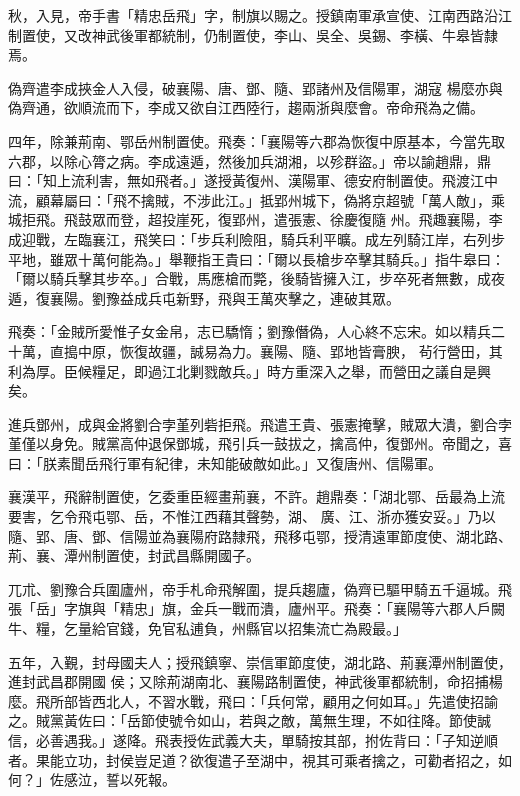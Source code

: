 \begin{pinyinscope}
 秋，入見，帝手書「精忠岳飛」字，制旗以賜之。授鎮南軍承宣使、江南西路沿江制置使，又改神武後軍都統制，仍制置使，李山、吳全、吳錫、李橫、牛皋皆隸焉。



 偽齊遣李成挾金人入侵，破襄陽、唐、鄧、隨、郢諸州及信陽軍，湖寇
 楊麼亦與偽齊通，欲順流而下，李成又欲自江西陸行，趨兩浙與麼會。帝命飛為之備。



 四年，除兼荊南、鄂岳州制置使。飛奏：「襄陽等六郡為恢復中原基本，今當先取六郡，以除心膂之病。李成遠遁，然後加兵湖湘，以殄群盜。」帝以諭趙鼎，鼎曰：「知上流利害，無如飛者。」遂授黃復州、漢陽軍、德安府制置使。飛渡江中流，顧幕屬曰：「飛不擒賊，不涉此江。」抵郢州城下，偽將京超號「萬人敵」，乘城拒飛。飛鼓眾而登，超投崖死，復郢州，遣張憲、徐慶復隨
 州。飛趣襄陽，李成迎戰，左臨襄江，飛笑曰：「步兵利險阻，騎兵利平曠。成左列騎江岸，右列步平地，雖眾十萬何能為。」舉鞭指王貴曰：「爾以長槍步卒擊其騎兵。」指牛皋曰：「爾以騎兵擊其步卒。」合戰，馬應槍而斃，後騎皆擁入江，步卒死者無數，成夜遁，復襄陽。劉豫益成兵屯新野，飛與王萬夾擊之，連破其眾。



 飛奏：「金賊所愛惟子女金帛，志已驕惰；劉豫僭偽，人心終不忘宋。如以精兵二十萬，直搗中原，恢復故疆，誠易為力。襄陽、隨、郢地皆膏腴，
 茍行營田，其利為厚。臣候糧足，即過江北剿戮敵兵。」時方重深入之舉，而營田之議自是興矣。



 進兵鄧州，成與金將劉合孛堇列砦拒飛。飛遣王貴、張憲掩擊，賊眾大潰，劉合孛堇僅以身免。賊黨高仲退保鄧城，飛引兵一鼓拔之，擒高仲，復鄧州。帝聞之，喜曰：「朕素聞岳飛行軍有紀律，未知能破敵如此。」又復唐州、信陽軍。



 襄漢平，飛辭制置使，乞委重臣經畫荊襄，不許。趙鼎奏：「湖北鄂、岳最為上流要害，乞令飛屯鄂、岳，不惟江西藉其聲勢，湖、
 廣、江、浙亦獲安妥。」乃以隨、郢、唐、鄧、信陽並為襄陽府路隸飛，飛移屯鄂，授清遠軍節度使、湖北路、荊、襄、潭州制置使，封武昌縣開國子。



 兀朮、劉豫合兵圍廬州，帝手札命飛解圍，提兵趨廬，偽齊已驅甲騎五千逼城。飛張「岳」字旗與「精忠」旗，金兵一戰而潰，廬州平。飛奏：「襄陽等六郡人戶闕牛、糧，乞量給官錢，免官私逋負，州縣官以招集流亡為殿最。」



 五年，入覲，封母國夫人；授飛鎮寧、崇信軍節度使，湖北路、荊襄潭州制置使，進封武昌郡開國
 侯；又除荊湖南北、襄陽路制置使，神武後軍都統制，命招捕楊麼。飛所部皆西北人，不習水戰，飛曰：「兵何常，顧用之何如耳。」先遣使招諭之。賊黨黃佐曰：「岳節使號令如山，若與之敵，萬無生理，不如往降。節使誠信，必善遇我。」遂降。飛表授佐武義大夫，單騎按其部，拊佐背曰：「子知逆順者。果能立功，封侯豈足道？欲復遣子至湖中，視其可乘者擒之，可勸者招之，如何？」佐感泣，誓以死報。




\end{pinyinscope}
